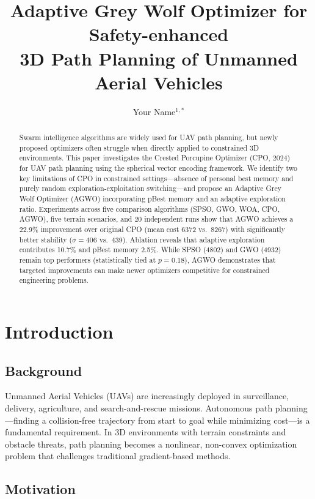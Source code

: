 \documentclass[12pt,a4paper]{article}
\title{Adaptive Grey Wolf Optimizer for Safety-enhanced \\
       3D Path Planning of Unmanned Aerial Vehicles}
\author{Your Name$^{1,*}$}
\date{}
\begin{document}
\maketitle

\begin{abstract}
Swarm intelligence algorithms are widely used for UAV path planning,
but newly proposed optimizers often struggle when directly applied to
constrained 3D environments. This paper investigates the Crested
Porcupine Optimizer (CPO, 2024) for UAV path planning using the
spherical vector encoding framework. We identify two key limitations
of CPO in constrained settings—absence of personal best memory and
purely random exploration-exploitation switching—and propose an
Adaptive Grey Wolf Optimizer (AGWO) incorporating pBest memory and an adaptive
exploration ratio. Experiments across five comparison algorithms
(SPSO, GWO, WOA, CPO, AGWO), five terrain scenarios, and 20
independent runs show that AGWO achieves a 22.9\% improvement over
original CPO (mean cost 6372 vs.\ 8267) with significantly better
stability ($\sigma=406$ vs.\ 439). Ablation reveals that adaptive
exploration contributes 10.7\% and pBest memory 2.5\%. While SPSO
(4802) and GWO (4932) remain top performers (statistically tied at
$p=0.18$), AGWO demonstrates that targeted improvements can make
newer optimizers competitive for constrained engineering problems.
\end{abstract}

\section{Introduction}

\subsection{Background}

Unmanned Aerial Vehicles (UAVs) are increasingly deployed in
surveillance, delivery, agriculture, and search-and-rescue missions.
Autonomous path planning—finding a collision-free trajectory from
start to goal while minimizing cost—is a fundamental requirement.
In 3D environments with terrain constraints and obstacle threats,
path planning becomes a nonlinear, non-convex optimization problem
that challenges traditional gradient-based methods.

\subsection{Motivation}
\end{document}
